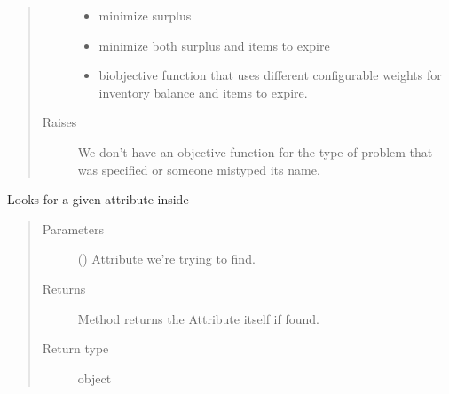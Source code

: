 \documentclass[letterpaper,10pt,english]{sphinxmanual}
\begin{document}
\begin{fulllineitems}
\begin{fulllineitems}
\begin{quote}
\begin{description}
\begin{itemize}
\item {} 
 minimize surplus

\item {} 
 minimize both surplus and items to expire

\item {} 
 bi\sphinxhyphen{}objective function that uses different configurable                 weights for inventory balance and items to expire.

\end{itemize}


\item[{Raises}] \leavevmode
{} \textendash{} We don’t have an objective function for the type of
    problem that was specified or someone mistyped its name.

\end{description}\end{quote}

\end{fulllineitems}


\begin{fulllineitems}
\label{\detokenize{source/optimization.model:optimization.model.optimizer.ObjectiveFunction.hasattr}}
Looks for a given attribute  inside 
\begin{quote}\begin{description}
\item[{Parameters}] \leavevmode
{} () \textendash{} Attribute we’re trying to find.

\item[{Returns}] \leavevmode
{} \textendash{} Method returns the Attribute itself if found.

\item[{Return type}] \leavevmode
object

\end{description}\end{quote}


\end{fulllineitems}
\end{fulllineitems}
\end{document}
